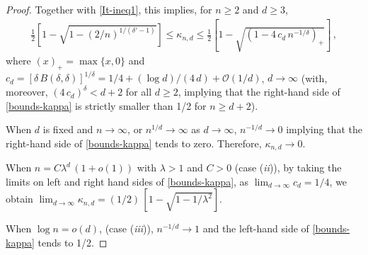 \documentclass[10pt,a4paper]{amsart}
\def\SO{{\mathcal O}}
\newcommand{\be}{\begin{eqnarray}}
\newcommand{\ee}{\end{eqnarray}}
\def\ml{\lambda}
\begin{document}
\begin{proof}
Together with \eqref{It-ineq1}, this implies, for $n\geq 2$ and $d\geq 3$,
\be\label{bounds-kappa}
\frac12 \left[1-\sqrt{1- (2/n)^{1/(\delta'-1)}}\right]  \leq \kappa_{n,d} \leq \frac12 \left[1-\sqrt{(1-4\,c_d\,n^{-1/\delta})_+}\right] \,,
\ee
where $(x)_+=\max\{x,0\}$ and $c_d=[\delta\,B(\delta,\delta)]^{1/\delta} = 1/4+ (\log d)/(4\,d)+\SO(1/d)$, $d\to\infty$ (with, moreover, $(4\,c_d)^\delta<d+2$ for all $d \geq 2$, implying that the right-hand side of \eqref{bounds-kappa} is strictly smaller than  1/2 for $n\geq d+2$).

When $d$ is fixed and $n\to\infty$, or $n^{1/d}\to\infty$ as $d\to\infty$, $n^{-1/d}\to 0$ implying that the right-hand side of \eqref{bounds-kappa} tends to zero. Therefore, $\kappa_{n,d}\to 0$.

When $n=C\ml^d\,(1+o(1))$ with $\ml>1$ and $C>0$ (case (\textit{ii})), by taking the limits on left and right hand sides of \eqref{bounds-kappa}, as $\lim_{d\to\infty} c_d=1/4$, we obtain $\lim_{d\to\infty} \kappa_{n,d} = (1/2)\,\left[1-\sqrt{1-1/\ml^2}\right]$.

When $\log n = o(d)$, (case (\textit{iii})), $n^{-1/d}\to 1$ and the left-hand side of \eqref{bounds-kappa} tends to 1/2.
\end{proof}
\end{document}

